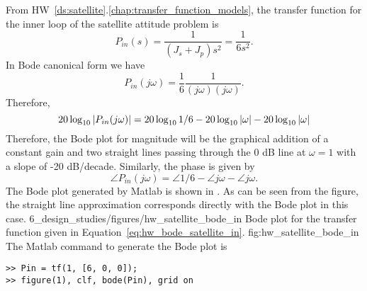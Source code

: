 From HW~\ref{ds:satellite}.\ref{chap:transfer_function_models}, the transfer function for the inner loop of the satellite attitude problem is 
\begin{equation}\label{eq:hw_bode_satellite_in_tf}
P_{in}(s) = \frac{1}{(J_s + J_p)s^2} = 
\frac{1}{6s^2}. 
\end{equation}
In Bode canonical form we have
\[
P_{in}(j\omega) = \frac{1}{6}\frac{1}{(j\omega)(j\omega)}.
\]
Therefore,
\begin{equation} \label{eq:hw_bode_satellite_in}
20\log_{10}\left|P_{in}(j\omega)\right|=
	20\log_{10} 1/6-20\log_{10}\left|\omega\right|-20\log_{10}\left|\omega\right|
\end{equation}
Therefore, the Bode plot for magnitude will be the graphical addition of a constant gain and two straight lines passing through the 0 dB line at $\omega = 1$ with a slope of -20 dB/decade.
Similarly, the phase is given by
\[
\angle P_{in}(j\omega) = 
\angle 1/6 
- \angle j\omega - \angle j\omega.
\]
The Bode plot generated by Matlab is shown in . As can be seen from the figure, the straight line approximation corresponds directly with the Bode plot in this case.
	{6_design_studies/figures/hw_satellite_bode_in}
	{Bode plot for the transfer function given in Equation~\eqref{eq:hw_bode_satellite_in}.}
	{fig:hw_satellite_bode_in}
The Matlab command to generate the Bode plot is
\begin{lstlisting}
>> Pin = tf(1, [6, 0, 0]);
>> figure(1), clf, bode(Pin), grid on
\end{lstlisting}


